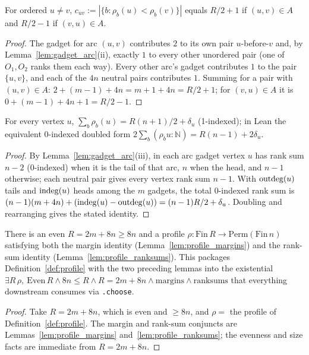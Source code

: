 \begin{lemma}
\label{lem:profile_margins}
\leanok
{}
For ordered $u \ne v$, $c_{uv} := |\{b : \rho_b(u) < \rho_b(v)\}|$ equals
$R/2 + 1$ if $(u,v) \in A$ and $R/2 - 1$ if $(v,u) \in A$.
\end{lemma}
\begin{proof}
\leanok
{}
The gadget for arc $(u,v)$ contributes $2$ to its own pair $u$-before-$v$ and,
by Lemma~\ref{lem:gadget_arc}(ii), exactly $1$ to every other unordered pair
(one of $O_1,O_2$ ranks them each way). Every other arc's gadget contributes $1$
to the pair $\{u,v\}$, and each of the $4n$ neutral pairs contributes $1$.
Summing for a pair with $(u,v) \in A$: $2 + (m-1) + 4n = m + 1 + 4n = R/2 + 1$;
for $(v,u) \in A$ it is $0 + (m-1) + 4n + 1 = R/2 - 1$.
\end{proof}

\begin{lemma}
\label{lem:profile_ranksums}
\leanok
{}
For every vertex $u$, $\sum_b \rho_b(u) = R(n+1)/2 + \delta_u$ (1-indexed); in
Lean the equivalent 0-indexed doubled form $2\sum_b (\rho_b u : \mathbb{N}) =
R(n-1) + 2\delta_u$.
\end{lemma}
\begin{proof}
\leanok
{}
By Lemma~\ref{lem:gadget_arc}(iii), in each arc gadget vertex $u$ has rank sum
$n-2$ (0-indexed) when it is the tail of that arc, $n$ when the head, and $n-1$
otherwise; each neutral pair gives every vertex rank sum $n-1$. With $\operatorname{outdeg}(u)$
tails and $\operatorname{indeg}(u)$ heads among the $m$ gadgets, the total 0-indexed rank sum
is $(n-1)(m + 4n) + (\operatorname{indeg}(u) - \operatorname{outdeg}(u)) = (n-1)R/2 + \delta_u$. Doubling and
rearranging gives the stated identity.
\end{proof}

\begin{lemma}
\label{lem:profile_gadget}
\leanok
{}
There is an even $R = 2m + 8n \ge 8n$ and a profile
$\rho : \mathrm{Fin}\,R \to \mathrm{Perm}(\mathrm{Fin}\,n)$ satisfying both the
margin identity (Lemma~\ref{lem:profile_margins}) and the rank-sum identity
(Lemma~\ref{lem:profile_ranksums}). This packages
Definition~\ref{def:profile} with the two preceding lemmas into the existential
$\exists R\,\rho,\ \mathrm{Even}\,R \wedge 8n \le R \wedge R = 2m+8n \wedge
\text{margins} \wedge \text{ranksums}$ that everything downstream consumes via
\texttt{.choose}.
\end{lemma}
\begin{proof}
\leanok
{}
Take $R = 2m + 8n$, which is even and $\ge 8n$, and $\rho = $ the profile of
Definition~\ref{def:profile}. The margin and rank-sum conjuncts are
Lemmas~\ref{lem:profile_margins} and~\ref{lem:profile_ranksums}; the evenness and
size facts are immediate from $R = 2m+8n$.
\end{proof}

